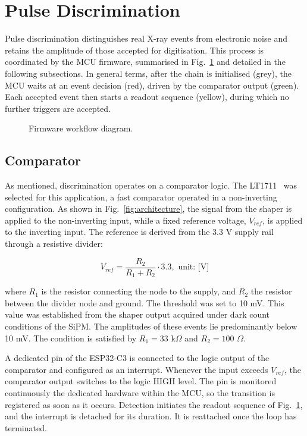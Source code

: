 \section{Pulse Discrimination}
\label{sec:pulse_discrimination}
Pulse discrimination distinguishes real X-ray events from electronic noise and retains the amplitude of those accepted for digitisation. This process is coordinated by the MCU firmware, summarised in Fig.~\ref{fig:firmware} and detailed in the following subsections. In general terms, after the chain is initialised (grey), the MCU waits at an event decision (red), driven by the comparator output (green). Each accepted event then starts a readout sequence (yellow), during which no further triggers are accepted.
\begin{figure}[H]
  \centering
  
  \caption[Firmware workflow diagram.]{Firmware workflow diagram.}
  \label{fig:firmware}
\end{figure}

\subsection{Comparator}
As mentioned, discrimination operates on a comparator logic. The LT1711~\cite{LT1711_LT1712} was selected for this application, a fast comparator operated in a non-inverting configuration. As shown in Fig.~\ref{fig:architecture}, the signal from the shaper is applied to the non-inverting input, while a fixed reference voltage, $V_{ref}$, is applied to the inverting input. The reference is derived from the 3.3 V supply rail through a resistive divider:

\begin{equation}
V_{ref} = \frac{R_2}{R_1 + R_2} \cdot 3.3, \text{ unit: [V]}
\label{eq:vref}
\end{equation}

\noindent where $R_1$ is the resistor connecting the node to the supply, and $R_2$ the resistor between the divider node and ground. The threshold was set to 10 mV. This value was established from the shaper output acquired under dark count conditions of the SiPM. The amplitudes of these events lie predominantly below 10 mV. The condition is satisfied by $R_1 = 33$ k$\Omega$ and $R_2 = 100$ $\Omega$.

A dedicated pin of the ESP32-C3 is connected to the logic output of the comparator and configured as an interrupt. Whenever the input exceeds $V_{ref}$, the comparator output switches to the logic HIGH level. The pin is monitored continuously the dedicated hardware within the MCU, so the transition is registered as soon as it occurs. Detection initiates the readout sequence of Fig.~\ref{fig:firmware}, and the interrupt is detached for its duration. It is reattached once the loop has terminated.

